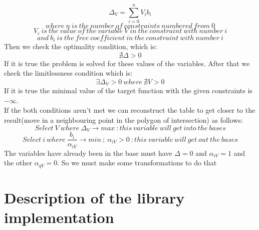 \documentclass[]{article}
\begin{document}
			$$\Delta_V = \displaystyle\sum_{i=0}^{n} V_i b_i$$
			$$where\ n\ is\ the\ number\ of\ constraints\ numbered\ from\ 0$$
			$$V_i\ is\ the\ value\ of\ the\ variable\ V\ in\ the\ constraint\ with\ number\ i$$
			$$and\ b_i\ is\ the\ free\ coefficient\ in\ the\ constraint\ with\ number\ i$$
			Then we check the optimality condition, which is:
			$$\nexists\Delta > 0$$
			If it is true the problem is solved for these values of the variables.
			After that we check the limitlessness condition which is:
			$$\exists\Delta_V > 0\ where\ \nexists V > 0$$
			If it is true the minimal value of the target function with the given constraints is $-\infty$.\\
			If the both conditions aren't met we can reconstruct the table to get closer to the result(move in a neighbouring point in the polygon of intersection) as follows:\\
			$$Select\ V\ where\ \Delta_V \to max\ :this\ variable\ will\ get\ into\ the\ bases$$
			$$Select\ i\ where\ \frac{b_i}{\alpha_{iV}} \to min\ ;\ \alpha_{iV} > 0\ :this\ variable\ will\ get\ out\ the\ bases$$
			The variables have already been in the base must have $\Delta=0$ and $\alpha_{iV} = 1$ and the other $\alpha_{qV} = 0$. So we must make some transformations to do that


	\newpage

	\section{Description of the library implementation}
\end{document}
